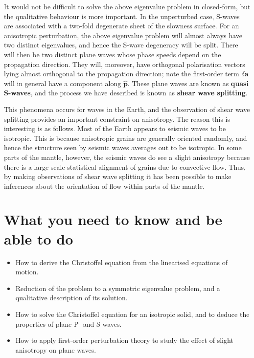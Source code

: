 \documentclass [a4paper,12pt]{paper}
\begin{document}
It would not be difficult to solve the above eigenvalue problem in closed-form, but the qualitative behaviour is more important. 
In the unperturbed case, S-waves are associated with a two-fold degenerate sheet of the slowness surface. For an 
anisotropic perturbation, the above eigenvalue problem will almost always have two distinct eigenvalues, and hence 
the S-wave degeneracy will be split. 
There will then be two distinct plane waves whose phase speeds depend on the propagation direction. They will, moreover, 
have orthogonal polarisation vectors lying almost orthogonal to the propagation direction; note the first-order term $\delta 
\mathbf{a}$ will in general have a component 
along $\hat{\mathbf{p}}$. These plane waves are known as \textbf{quasi S-waves}, and the process we have described is 
known as \textbf{shear wave splitting}. 

This phenomena occurs for waves in the Earth, and the observation of shear wave 
splitting provides an important constraint on anisotropy. 
The reason this is interesting is as follows. Most of the Earth appears to seismic waves to be isotropic. This is 
because anisotropic grains are generally oriented randomly, and hence the structure seen by seismic waves averages 
out to be isotropic. In some parts of the mantle, however, 
the seismic waves do see a slight anisotropy because there is a large-scale statistical alignment of grains due to 
convective flow. Thus, by making observations of shear wave splitting it has been possible to make inferences about 
the orientation of flow within parts of the mantle.


\section*{What you need to know and be able to do}
\begin{itemize}
    \item[(i)] How to derive the Christoffel equation from the linearised equations of motion.
    \item[(ii)] Reduction of the problem to a symmetric eigenvalue problem, and a qualitative description of its solution.
    \item[(iii)] How to solve the Christoffel equation for an isotropic solid, and to deduce the properties of plane P- and S-waves.
    \item[(iv)] How to apply first-order perturbation theory to study the effect of slight anisotropy on plane waves.
\end{itemize}
\end{document}
